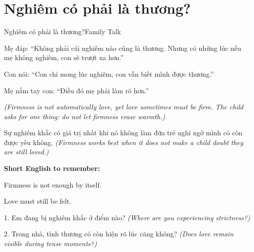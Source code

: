 \section{Nghiêm có phải là thương?}
\begin{truyen}{Nghiêm có phải là thương?}{Family Talk}

Mẹ đáp: ``Không phải cái nghiêm nào cũng là thương. Nhưng có những lúc nếu mẹ không nghiêm, con sẽ trượt xa hơn.''

Con nói: ``Con chỉ mong lúc nghiêm, con vẫn biết mình được thương.''

Mẹ nắm tay con: ``Điều đó mẹ phải làm rõ hơn.''

\textit{(Firmness is not automatically love, yet love sometimes must be firm. The child asks for one thing: do not let firmness erase warmth.)}
\end{truyen}

\begin{baihoc}
Sự nghiêm khắc có giá trị nhất khi nó không làm đứa trẻ nghi ngờ mình có còn được yêu không.
\textit{(Firmness works best when it does not make a child doubt they are still loved.)}
\end{baihoc}

\begin{ghinhoanh}
\textbf{Short English to remember:}

Firmness is not enough by itself.

Love must still be felt.
\end{ghinhoanh}

\begin{tuhocnhanh}
1. Em đang bị nghiêm khắc ở điểm nào? \textit{(Where are you experiencing strictness?)}

2. Trong nhà, tình thương có còn hiện rõ lúc căng không? \textit{(Does love remain visible during tense moments?)}
\end{tuhocnhanh}
\ngancach